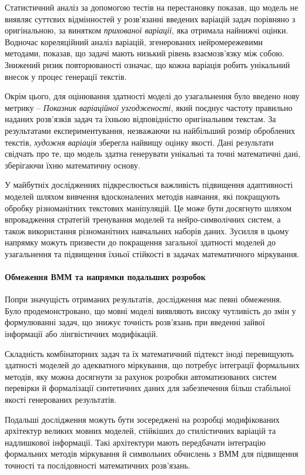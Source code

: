 Статистичний аналіз за допомогою тестів на перестановку показав, що модель не виявляє суттєвих відмінностей у розв'язанні введених варіацій задач порівняно з оригінальною, за винятком \emph{прихованої варіації}, яка отримала найнижчі оцінки. Водночас кореляційний аналіз варіацій, згенерованих нейромережевими методами, показав, що задачі мають низький рівень взаємозв'язку між собою. Знижений ризик повторюваності означає, що кожна варіація робить унікальний внесок у процес генерації текстів.

Окрім цього, для оцінювання здатності моделі до узагальнення було введено нову метрику -- \emph{Показник варіаційної узгодженості}, який поєднує частоту правильно наданих розв'язків задач та їхньою відповідністю оригінальним текстам. За результатами експериментування, незважаючи на найбільший розмір оброблених текстів, \emph{художня варіація} зберегла найвищу оцінку якості. Дані результати свідчать про те, що модель здатна генерувати унікальні та точні математичні дані, зберігаючи їхню математичну основу.

У майбутніх дослідженнях підкреслюється важливість підвищення адаптивності моделей шляхом вивчення вдосконалених методів навчання, які покращують обробку різноманітних текстових маніпуляцій. Це може бути досягнуто шляхом впровадження стратегій тренування моделей та нейро-символічних систем, а також використання різноманітних навчальних наборів даних. Зусилля в цьому напрямку можуть призвести до покращення загальної здатності моделей до узагальнення та підвищення їхньої стійкості в задачах математичного міркування.

\paragraph{Обмеження ВММ та напрямки подальших розробок}
Попри значущість отриманих результатів, дослідження має певні обмеження. Було продемонстровано, що мовні моделі виявляють високу чутливість до змін у формулюванні задач, що знижує точність розв'язань при введенні зайвої інформації або лінгвістичних модифікацій.

Складність комбінаторних задач та їх математичний підтекст іноді перевищують здатності моделей до адекватного міркування, що потребує інтеграції формальних методів, яку можна досягнути за рахунок розробки автоматизованих систем перевірки й формалізації синтетичних даних для забезпечення більш стабільної якості генерованих результатів.

Подальші дослідження можуть бути зосереджені на розробці модифікованих архітектур великих мовних моделей, стійкіших до стилістичних варіацій та надлишкової інформації. Такі архітектури мають передбачати інтеграцію формальних методів міркування й символьних обчислень з ВММ для підвищення точності та послідовності математичних розв'язань.

